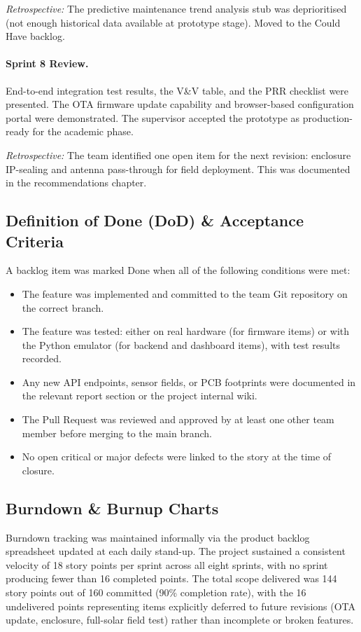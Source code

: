 \textit{Retrospective:} The predictive maintenance trend analysis stub was deprioritised (not enough historical data available at prototype stage). Moved to the Could Have backlog.

\paragraph{Sprint 8 Review.} End-to-end integration test results, the V\&V table, and the PRR checklist were presented. The OTA firmware update capability and browser-based configuration portal were demonstrated. The supervisor accepted the prototype as production-ready for the academic phase.

\textit{Retrospective:} The team identified one open item for the next revision: enclosure IP-sealing and antenna pass-through for field deployment. This was documented in the recommendations chapter.

\subsection{Definition of Done (DoD) \& Acceptance Criteria}

A backlog item was marked Done when all of the following conditions were met:

\begin{itemize}
    \item The feature was implemented and committed to the team Git repository on the correct branch.
    \item The feature was tested: either on real hardware (for firmware items) or with the Python emulator (for backend and dashboard items), with test results recorded.
    \item Any new API endpoints, sensor fields, or PCB footprints were documented in the relevant report section or the project internal wiki.
    \item The Pull Request was reviewed and approved by at least one other team member before merging to the main branch.
    \item No open critical or major defects were linked to the story at the time of closure.
\end{itemize}

\subsection{Burndown \& Burnup Charts}

Burndown tracking was maintained informally via the product backlog spreadsheet updated at each daily stand-up. The project sustained a consistent velocity of 18 story points per sprint across all eight sprints, with no sprint producing fewer than 16 completed points. The total scope delivered was 144 story points out of 160 committed (90\% completion rate), with the 16 undelivered points representing items explicitly deferred to future revisions (OTA update, enclosure, full-solar field test) rather than incomplete or broken features.
